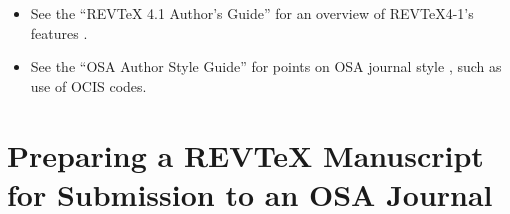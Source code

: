\documentclass[osajnl,twocolumn,showpacs,superscriptaddress,10pt]{revtex4-1} %
\begin{document}
\begin{itemize}

\itemsep1em

\item See the ``REVTeX 4.1 Author's Guide'' for an overview of REV\TeX{}4-1's features \cite{revtex-au}.

\item See the ``OSA Author Style Guide'' for points on OSA journal style \cite{osastyle}, such as use of OCIS codes.

\end{itemize}

\section{Preparing a REVTeX{} Manuscript for Submission to an OSA Journal}
\end{document}
